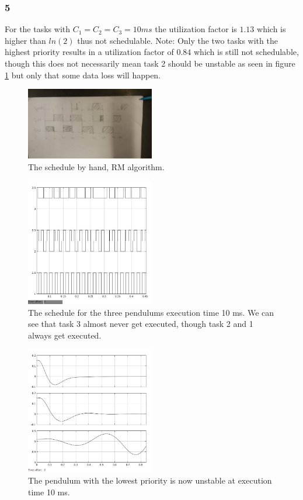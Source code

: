 \documentclass[10pt,a4paper]{article}
\begin{document}
\subsubsection*{5}
For the tasks with $C_1=C_2=C_3=10 ms$ the utilization factor is $1.13$ which is higher than $ln(2)$ thus not schedulable. Note: Only the two tasks with the highest priority results in a utilization factor of $0.84$ which is still not schedulable, though this does not necessarily mean task 2 should be unstable as seen in figure \ref{1} but only that some data loss will happen.
\begin{figure}[!h]
  \centering
    \includegraphics[width=0.5\textwidth]{egen3.jpg}
      \caption{The schedule by hand, RM algorithm.}
\end{figure}
\begin{figure}[!h]
  \centering
    \includegraphics[width=0.5\textwidth]{schedual10ms.jpg}
      \caption{The schedule for the three pendulums execution time 10 ms. We can see that task 3 almost never get executed, though task 2 and 1 always get executed.}
\end{figure}
\begin{figure}[!h]\label{1}
  \centering
    \includegraphics[width=0.5\textwidth]{10ms.jpg}
      \caption{The pendulum with the lowest priority is now unstable at execution time 10 ms.}
\end{figure}
\newpage
\end{document}
